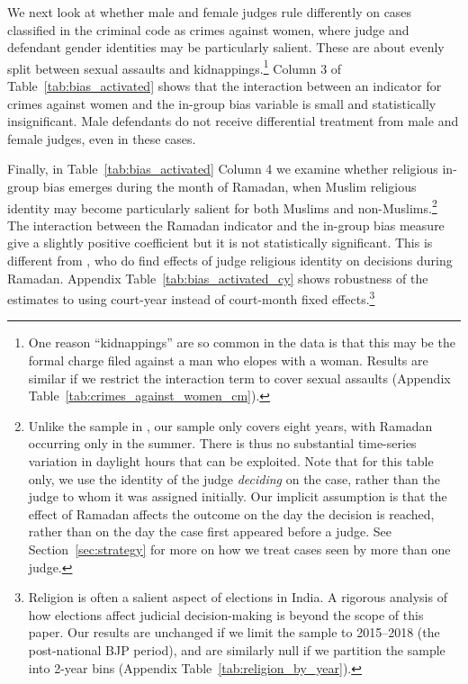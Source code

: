 \documentclass[12pt,english]{article}
\begin{document}
We next look at whether male and female judges rule differently on cases classified in the criminal code as crimes against women, where judge and defendant gender identities may be particularly salient. These are about evenly split between sexual assaults and kidnappings.\footnote{One reason ``kidnappings'' are so common in the data is that this may be the formal charge filed against a man who elopes with a woman. Results are similar if we restrict the interaction term to cover sexual assaults (Appendix Table~\ref{tab:crimes_against_women_cm}).} Column 3 of Table~\ref{tab:bias_activated} shows that the interaction between an indicator for crimes against women and the in-group bias variable is small and statistically insignificant. Male defendants do not receive differential treatment from male and female judges, even in these cases.

Finally, in Table~\ref{tab:bias_activated} Column 4 we examine whether religious in-group bias emerges during the month of Ramadan, when Muslim religious identity may become particularly salient for both Muslims and non-Muslims.\footnote{Unlike the sample in \citet{Mehmood2020}, our sample only covers eight years, with Ramadan occurring only in the summer. There is thus no substantial time-series variation in daylight hours that can be exploited. Note that for this table only, we use the identity of the judge \textit{deciding} on the case, rather than the judge to whom it was assigned initially. Our implicit assumption is that the effect of Ramadan affects the outcome on the day the decision is reached, rather than on the day the case first appeared before a judge. See Section~\ref{sec:strategy} for more on how we treat cases seen by more than one judge.} The interaction between the Ramadan indicator and the in-group bias measure give a slightly positive coefficient but it is not statistically significant. This is different from \citep{Mehmood2020}, who do find effects of judge religious identity on decisions during Ramadan. Appendix Table~\ref{tab:bias_activated_cy} shows robustness of the estimates to using court-year instead of court-month fixed effects.\footnote{Religion is often a salient aspect of elections in India. A rigorous analysis of how elections affect judicial decision-making is beyond the scope of this paper. Our results are unchanged if we limit the sample to 2015--2018 (the post-national BJP period), and are similarly null if we partition the sample into 2-year bins (Appendix Table~\ref{tab:religion_by_year}).} 
\end{document}
